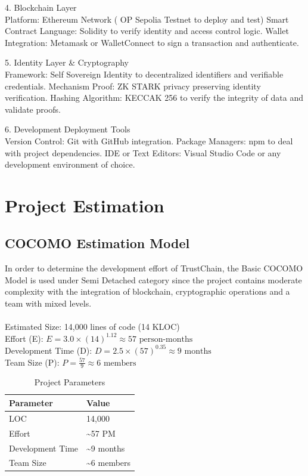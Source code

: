 4. Blockchain Layer\\
Platform: Ethereum Network ( OP Sepolia Testnet to deploy and test)
Smart Contract Language: Solidity to verify identity and access control logic.
Wallet Integration: Metamask or WalletConnect to sign a transaction and authenticate.

5. Identity Layer \& Cryptography\\
Framework: Self Sovereign Identity to decentralized identifiers and verifiable credentials.
Mechanism Proof: ZK STARK privacy preserving identity verification.
Hashing Algorithm: KECCAK 256 to verify the integrity of data and validate proofs.

6. Development Deployment Tools\\
Version Control: Git with GitHub integration.
Package Managers: npm to deal with project dependencies.
IDE or Text Editors: Visual Studio Code or any development environment of choice.



\section{Project Estimation}

\subsection{COCOMO Estimation Model}
In order to determine the development effort of TrustChain, the Basic COCOMO Model is used under Semi Detached category since the project contains moderate complexity with the integration of blockchain, cryptographic operations and a team with mixed levels.
\\
\\
Estimated Size: 14,000 lines of code (14 KLOC)\\
Effort (E): $E = 3.0 \times (14)^{1.12} \approx 57 \text{ person-months}$\\
Development Time (D): $D = 2.5 \times (57)^{0.35} \approx 9 \text{ months}$\\
Team Size (P): $P = \frac{57}{9} \approx 6 \text{ members}$

\begin{table}[h!]
\centering
\begin{tabular}{|l|l|}
\hline
\textbf{Parameter}        & \textbf{Value}       \\
\hline
LOC                      & 14,000             \\
Effort                   & \textasciitilde57 PM    \\
Development Time         & \textasciitilde9 months \\
Team Size                & \textasciitilde6 members \\
\hline
\end{tabular}
\caption{Project Parameters}
\label{tab:project_parameters}
\end{table}


